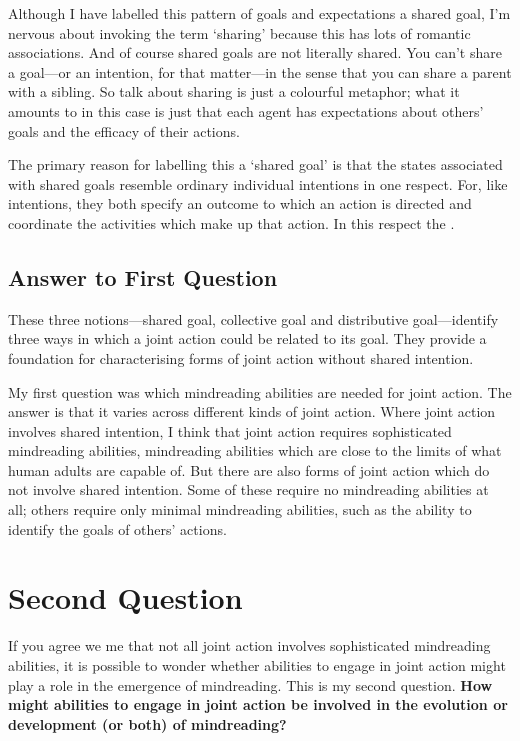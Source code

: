 \documentclass[12pt,a4paper]{extarticle}
\begin{document}
Although I have labelled this pattern of goals and expectations a shared goal, I'm nervous about invoking the term `sharing' because this has lots of romantic associations.  And of course shared goals are not literally shared.  You can't share a goal---or an intention, for that matter---in the sense that you can share a parent with a sibling.  So talk about sharing is just a colourful metaphor; what it amounts to in this case is just that each agent has expectations about others' goals and the efficacy of their actions.

The primary reason for labelling this a `shared goal' is that the states associated with shared goals resemble ordinary individual intentions in one respect.  For, like intentions, they both specify an outcome to which an action is directed and coordinate the activities which make up that action.  In this respect the .


\subsection{Answer to First Question}
These three notions---shared goal, collective goal and distributive goal---identify three ways in which a joint action could be related to its goal.
They provide a foundation for characterising forms of joint action without shared intention.

My first question was which mindreading abilities are needed for joint action.
The answer is that it varies across different kinds of joint action.
Where joint action involves shared intention, I think that joint action requires sophisticated mindreading abilities, mindreading abilities which are close to the limits of what human adults are capable of.
But there are also forms of joint action which do not involve shared intention.
Some of these require no mindreading abilities at all; others require only minimal mindreading abilities, such as the ability to identify the goals of others' actions.



\section{Second Question}

If you agree we me that not all joint action involves sophisticated mindreading abilities, it is possible to wonder whether abilities to engage in joint action might play a role in the emergence of mindreading.  This is my second question.  \textbf{How might abilities to engage in joint action be involved in the evolution or development (or both) of mindreading?}
\end{document}
